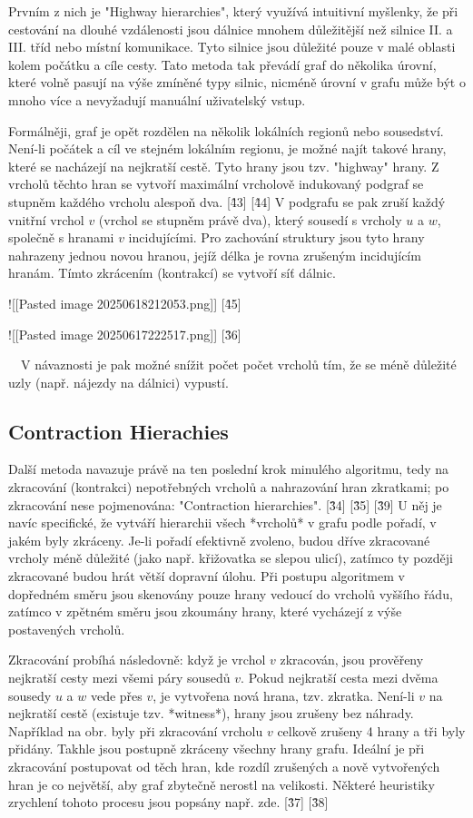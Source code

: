 Prvním z nich je "Highway hierarchies", který využívá intuitivní myšlenky, že při cestování na dlouhé vzdálenosti jsou dálnice mnohem důležitější než silnice II. a III. tříd nebo místní komunikace. Tyto silnice jsou důležité pouze v malé oblasti kolem počátku a cíle cesty. Tato metoda tak převádí graf do několika úrovní, které volně pasují na výše zmíněné typy silnic, nicméně úrovní v grafu může být o mnoho více a nevyžadují manuální uživatelský vstup.

Formálněji, graf je opět rozdělen na několik lokálních regionů nebo sousedství. Není-li počátek a cíl ve stejném lokálním regionu, je možné najít takové hrany, které se nacházejí na nejkratší cestě. Tyto hrany jsou tzv. "highway" hrany. Z vrcholů těchto hran se vytvoří maximální vrcholově indukovaný podgraf se stupněm každého vrcholu alespoň dva. [\^43] [\^44]  V podgrafu se pak zruší každý vnitřní vrchol $v$ (vrchol se stupněm právě dva), který sousedí s vrcholy $u$ a $w$, společně s hranami $v$ incidujícími. Pro zachování struktury jsou tyto hrany nahrazeny jednou novou hranou, jejíž délka je rovna zrušeným incidujícím hranám.  Tímto zkrácením (kontrakcí) se vytvoří síť dálnic.

![[Pasted image 20250618212053.png]]
[\^45]

![[Pasted image 20250617222517.png]]
[\^36]

~~V návaznosti je pak možné snížit počet počet vrcholů tím, že se méně důležité uzly (např. nájezdy na dálnici) vypustí.~~ 

\subsection{ Contraction Hierachies }
Další metoda navazuje právě na ten poslední krok minulého algoritmu, tedy na zkracování (kontrakci) nepotřebných vrcholů a nahrazování hran zkratkami; po zkracování nese pojmenována:  "Contraction hierarchies". [\^34] [\^35] [\^39]  U něj je navíc specifické, že vytváří hierarchii všech *vrcholů* v grafu podle pořadí, v jakém byly zkráceny. Je-li pořadí efektivně zvoleno, budou dříve zkracované vrcholy méně důležité (jako např. křižovatka se slepou ulicí), zatímco ty později zkracované budou hrát větší dopravní úlohu. Při postupu algoritmem v dopředném směru jsou skenovány pouze hrany vedoucí do vrcholů vyššího řádu, zatímco v zpětném směru jsou zkoumány hrany, které vycházejí z výše postavených vrcholů.
 
Zkracování probíhá následovně: když je vrchol $v$ zkracován, jsou prověřeny nejkratší cesty mezi všemi páry sousedů $v$. Pokud nejkratší cesta mezi dvěma sousedy $u$ a $w$ vede přes $v$, je vytvořena nová hrana, tzv. zkratka. Není-li $v$ na nejkratší cestě (existuje tzv. *witness*), hrany jsou zrušeny bez náhrady. Například na obr. byly při zkracování vrcholu $v$ celkově zrušeny 4 hrany a tři byly přidány. Takhle jsou postupně zkráceny všechny hrany grafu. Ideální je při zkracování postupovat od těch hran, kde rozdíl zrušených a nově vytvořených hran je co největší, aby graf zbytečně nerostl na velikosti. Některé heuristiky zrychlení tohoto procesu jsou popsány např. zde. [\^37] [\^38]

